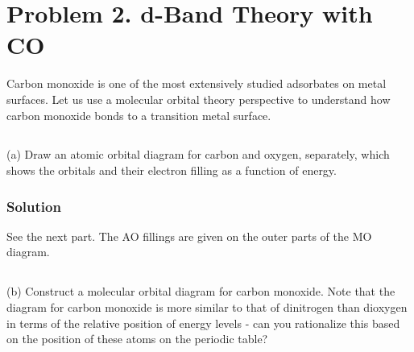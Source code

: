 \documentclass[12pt]{article}
\begin{document}
\section{Problem 2. d-Band Theory with CO}
Carbon monoxide is one of the most extensively studied adsorbates on metal surfaces. Let us use a molecular orbital theory perspective to understand how carbon monoxide bonds to a transition metal surface.\\
\subsection{}
(a) Draw an atomic orbital diagram for carbon and oxygen, separately, which shows the orbitals and their electron filling as a function of energy.\\
\subsubsection{Solution}
See the next part. The AO fillings are given on the outer parts of the MO diagram.
\subsection{}
(b) Construct a molecular orbital diagram for carbon monoxide. Note that the diagram for carbon monoxide is more similar to that of dinitrogen than dioxygen in terms of the relative position of energy levels - can you rationalize this based on the position of these atoms on the periodic table?\\
\end{document}
